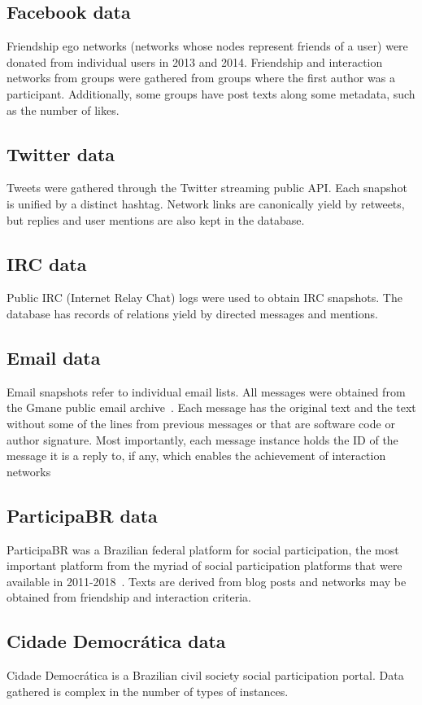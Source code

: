 \documentclass[review]{elsarticle}
\begin{document}
\subsection{Facebook data}
Friendship ego networks (networks whose nodes represent friends of a user)
were donated from individual users in 2013 and 2014.
Friendship and interaction networks from groups were gathered from
groups where the first author was a participant.
Additionally, some groups have post texts along some metadata, such as
the number of likes.

\subsection{Twitter data}
Tweets were gathered through the Twitter streaming public API.
Each snapshot is unified by a distinct hashtag.
Network links are canonically yield by retweets,
but replies and user mentions are also kept in the database.

\subsection{IRC data}
Public IRC (Internet Relay Chat) logs were used to obtain IRC snapshots.
The database has records of relations yield by directed messages and
mentions.

\subsection{Email data}
Email snapshots refer to individual email lists.
All messages were obtained from the Gmane public email archive~\cite{gmane}.
Each message has the original text and the text without some of the lines
from previous messages or that are software code or author signature.
Most importantly, each message instance holds the ID of the message it is
a reply to, if any, which enables the achievement of interaction networks~\cite{bird,stab}

\subsection{ParticipaBR data}
ParticipaBR was a Brazilian federal platform for social participation,
the most important platform from the myriad of social participation platforms
that were available in 2011-2018~\cite{spbr}.
Texts are derived from blog posts and networks may be obtained from
friendship and interaction criteria.

\subsection{Cidade Democr\'atica data}
Cidade Democrática is a Brazilian civil society social participation portal.
Data gathered is complex in the number of types of instances.
\end{document}
